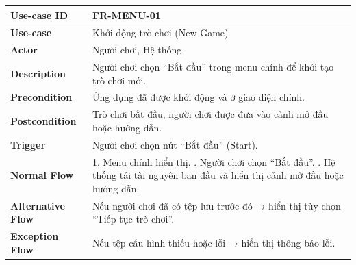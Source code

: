 \begin{table}[H]
\centering
\begin{tabular}{|p{4cm}|p{10cm}|}
\hline
\textbf{Use-case ID} & FR-MENU-01 \\ \hline
\textbf{Use-case} & Khởi động trò chơi (New Game) \\ \hline
\textbf{Actor} & Người chơi, Hệ thống \\ \hline
\textbf{Description} & Người chơi chọn “Bắt đầu” trong menu chính để khởi tạo trò chơi mới. \\ \hline
\textbf{Precondition} & Ứng dụng đã được khởi động và ở giao diện chính. \\ \hline
\textbf{Postcondition} & Trò chơi bắt đầu, người chơi được đưa vào cảnh mở đầu hoặc hướng dẫn. \\ \hline
\textbf{Trigger} & Người chơi chọn nút “Bắt đầu” (Start). \\ \hline
\textbf{Normal Flow} &
1. Menu chính hiển thị. \newline
2. Người chơi chọn “Bắt đầu”. \newline
3. Hệ thống tải tài nguyên ban đầu và hiển thị cảnh mở đầu hoặc hướng dẫn. \\ \hline
\textbf{Alternative Flow} &
Nếu người chơi đã có tệp lưu trước đó → hiển thị tùy chọn “Tiếp tục trò chơi”. \\ \hline
\textbf{Exception Flow} &
Nếu tệp cấu hình thiếu hoặc lỗi → hiển thị thông báo lỗi. \\ \hline
\end{tabular}
\end{table}


